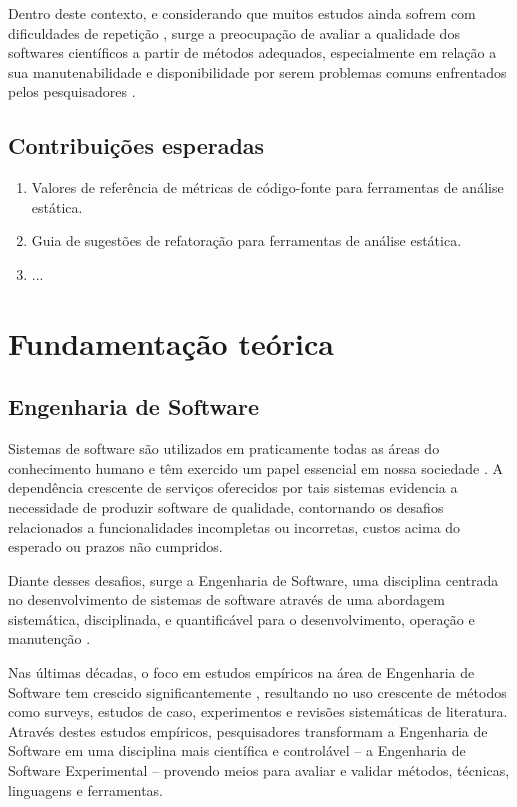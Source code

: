 \documentclass[qual, classic, a4paper]{ufbathesis}
\begin{document}
Dentro deste contexto, e considerando que muitos estudos ainda sofrem com
dificuldades de repetição \cite{Tang2016}, surge a preocupação de avaliar a
qualidade dos softwares científicos a partir de métodos adequados,
especialmente em relação a sua manutenabilidade e disponibilidade por serem
problemas comuns enfrentados pelos pesquisadores \cite{Prlic2012}.

\section{Contribuições esperadas}

\begin{enumerate}
  \item Valores de referência de métricas de código-fonte para ferramentas
    de análise estática.
  \item Guia de sugestões de refatoração para ferramentas de análise estática.
  \item ...
\end{enumerate}

\chapter{Fundamentação teórica}

\section{Engenharia de Software}

Sistemas de software são utilizados em praticamente todas as áreas do
conhecimento humano e têm exercido um papel essencial em nossa sociedade
\cite{Mafra2006}. A dependência crescente de serviços oferecidos por tais
sistemas evidencia a necessidade de produzir software de qualidade,
contornando os  desafios relacionados a funcionalidades incompletas ou
incorretas, custos acima do esperado ou prazos não cumpridos.

Diante desses desafios, surge a Engenharia de Software, uma disciplina
centrada no desenvolvimento de sistemas de software através
de uma abordagem sistemática, disciplinada, e quantificável para o
desenvolvimento, operação e manutenção \cite{SWEBOK2014}.

Nas últimas décadas, o foco em estudos empíricos na área de Engenharia de
Software tem crescido significantemente \cite{Stol2015}, resultando no uso
crescente de métodos como surveys, estudos de caso, experimentos e revisões
sistemáticas de literatura. Através destes estudos empíricos, pesquisadores
transformam a Engenharia de Software em uma disciplina mais científica e
controlável -- a  Engenharia de Software Experimental -- provendo meios para
avaliar e validar métodos, técnicas, linguagens e ferramentas.
\end{document}
